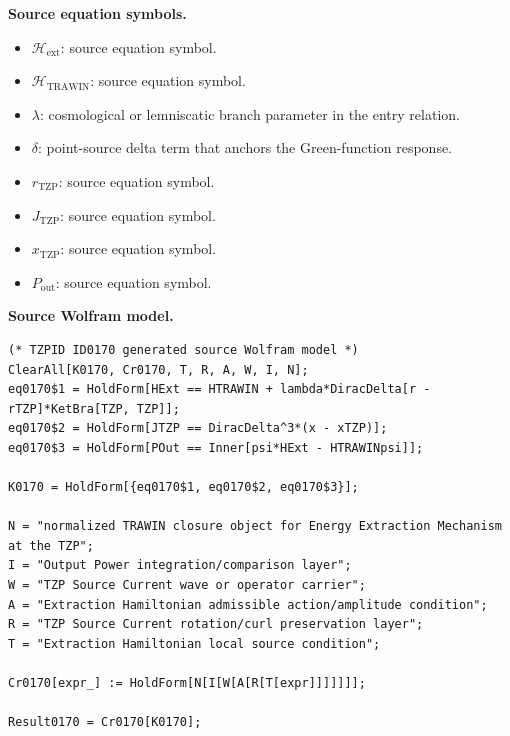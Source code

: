 \begin{minipage}[t]{0.49\linewidth}
\begingroup
\small
\raggedright
\textbf{Source equation symbols.}\par
\begin{itemize}[leftmargin=1.35em,itemsep=1pt,topsep=1pt,parsep=0pt]
    \item $\mathcal{H}_{\mathrm{ext}}$: source equation symbol.
    \item $\mathcal{H}_{\mathrm{TRAWIN}}$: source equation symbol.
    \item $\lambda$: cosmological or lemniscatic branch parameter in the entry relation.
    \item $\delta$: point-source delta term that anchors the Green-function response.
    \item $r_{\mathrm{TZP}}$: source equation symbol.
    \item $J_{\mathrm{TZP}}$: source equation symbol.
    \item $x_{\mathrm{TZP}}$: source equation symbol.
    \item $P_{\mathrm{out}}$: source equation symbol.
\end{itemize}
\endgroup
\end{minipage}\hfill
\begin{minipage}[t]{0.47\linewidth}
\begingroup
\scriptsize
\raggedright
\textbf{Source Wolfram model.}\par
\begin{Verbatim}[fontsize=\tiny,breaklines=true,breakanywhere=true]
(* TZPID ID0170 generated source Wolfram model *)
ClearAll[K0170, Cr0170, T, R, A, W, I, N];
eq0170$1 = HoldForm[HExt == HTRAWIN + lambda*DiracDelta[r - rTZP]*KetBra[TZP, TZP]];
eq0170$2 = HoldForm[JTZP == DiracDelta^3*(x - xTZP)];
eq0170$3 = HoldForm[POut == Inner[psi*HExt - HTRAWINpsi]];

K0170 = HoldForm[{eq0170$1, eq0170$2, eq0170$3}];

N = "normalized TRAWIN closure object for Energy Extraction Mechanism at the TZP";
I = "Output Power integration/comparison layer";
W = "TZP Source Current wave or operator carrier";
A = "Extraction Hamiltonian admissible action/amplitude condition";
R = "TZP Source Current rotation/curl preservation layer";
T = "Extraction Hamiltonian local source condition";

Cr0170[expr_] := HoldForm[N[I[W[A[R[T[expr]]]]]]];

Result0170 = Cr0170[K0170];
\end{Verbatim}
\endgroup
\end{minipage}

